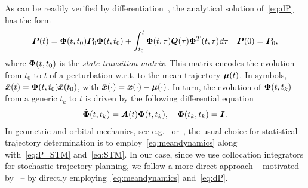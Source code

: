 As can be readily verified by differentiation~\cite{Gajic:LyapunovMatrixEquation:2010}, the analytical solution of~\eqref{eq:dP} has the form
\begin{align}\label{eq:P_STM}
\bP(t) = \bPhi(t,t_0) \bP_0 \bPhi(t,t_0)+\int_{t_0}^{t} \bPhi(t,\tau) \bQ(\tau) \bPhi^T(t,\tau) \dd \tau \quad \bP(0)=\bP_0,
\end{align}
where $\boldsymbol{\Phi}(t,t_0)$ is the \emph{state transition matrix}. This matrix encodes the evolution from $t_0$ to $t$ of a perturbation w.r.t. to the mean trajectory $\boldsymbol{\mu}(t)$. In symbols, $\bar{\boldsymbol{x}}(t) = \boldsymbol{\Phi}(t,t_0) \bar{\boldsymbol{x}}(t_0)$, with $\bar{\boldsymbol{x}}(\cdot) =\boldsymbol{x}(\cdot) - \boldsymbol{\mu}(\cdot) $. In turn, the evolution of $\boldsymbol{\Phi}(t,t_k)$ from a generic $t_k$ to $t$ is driven by the following differential equation
\begin{align}\label{eq:STM}
\dbPhi(t,t_k) = \bA(t)\bPhi(t,t_k), \quad \bPhi(t_k, t_k) = \bI.
\end{align}
In geometric and orbital mechanics, see e.g.~\cite{Maruskin:DynamicalSystemsGeometric:2018} or~\cite{Tapley:StatisticalOrbitDetermination:2004}, the usual choice for statistical trajectory determination is to employ~\eqref{eq:meandynamics} along with~\eqref{eq:P_STM} and~\eqref{eq:STM}. In our case, since we use collocation integrators for stochastic trajectory planning, we follow a more direct approach -- motivated by~\cite{Gillis:PracticalMethodsApproximate:2015} -- by directly employing~\eqref{eq:meandynamics} and~\eqref{eq:dP}.

